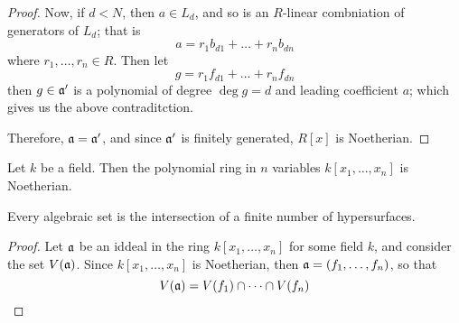 \begin{proof}
     Now, if $d<N$, then  $a \in L_d$, and so is an  $R$-linear combniation of
     generators of  $L_d$; that is
     \begin{equation*}
         a=r_1b_{d1}+\dots+r_nb_{dn}
     \end{equation*}
     where $r_1, \dots, r_n \in R$. Then let
     \begin{equation*}
         g=r_1f_{d1}+\dots+r_nf_{dn}
     \end{equation*}
     then $g \in \mathfrak{a}'$ is a polynomial of degree  $\deg{g}=d$ and leading
     coefficient $a$; which gives us the above contraditction.

     Therefore, $\mathfrak{a}=\mathfrak{a}'$, and since $\mathfrak{a}'$ is finitely generated,  $R[x]$ is
     Noetherian.
 \end{proof}
 \begin{corollary}
     Let $k$ be a field. Then the polynomial ring in  $n$ variables  $k[x_1,
     \dots, x_n]$ is Noetherian.
 \end{corollary}

 \begin{theorem}\label{1.4.2}
     Every algebraic set is the intersection of a finite number of
     hypersurfaces.
 \end{theorem}
 \begin{proof}
     Let $\mathfrak{a}$ be an iddeal in the ring $k[x_1, \dots, x_n]$ for some field $k$,
     and consider the set $V(\mathfrak{a})$. Since $k[x_1, \dots, x_n]$ is Noetherian,
     then $\mathfrak{a}=(f_1, \dots, f_n)$, so that
     \begin{equation*}
         V(\mathfrak{a})=V(f_1) \cap \dots \cap V(f_n)
     \end{equation*}
 \end{proof}

